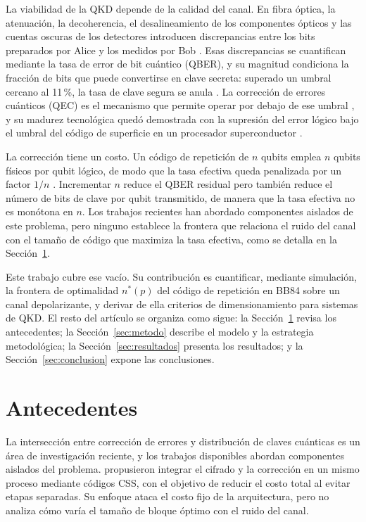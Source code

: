 \documentclass[conference]{IEEEtran}
\begin{document}
La viabilidad de la QKD depende de la calidad del canal. En fibra óptica, la
atenuación, la decoherencia, el desalineamiento de los componentes ópticos y las
cuentas oscuras de los detectores introducen discrepancias entre los bits
preparados por Alice y los medidos por Bob \cite{xu2020}. Esas discrepancias se
cuantifican mediante la tasa de error de bit cuántico (QBER), y su magnitud
condiciona la fracción de bits que puede convertirse en clave secreta: superado
un umbral cercano al 11\,\%, la tasa de clave segura se anula \cite{shor2000}.
La corrección de errores cuánticos (QEC) es el mecanismo que permite operar por
debajo de ese umbral \cite{nielsen2010,terhal2015}, y su madurez tecnológica
quedó demostrada con la supresión del error lógico bajo el umbral del código de
superficie en un procesador superconductor \cite{acharya2025}.

La corrección tiene un costo. Un código de repetición de $n$ qubits emplea $n$
qubits físicos por qubit lógico, de modo que la tasa efectiva queda penalizada
por un factor $1/n$ \cite{fowler2012}. Incrementar $n$ reduce el QBER residual
pero también reduce el número de bits de clave por qubit transmitido, de manera
que la tasa efectiva no es monótona en $n$. Los trabajos recientes han abordado
componentes aislados de este problema, pero ninguno establece la frontera que
relaciona el ruido del canal con el tamaño de código que maximiza la tasa
efectiva, como se detalla en la Sección~\ref{sec:antecedentes}.

Este trabajo cubre ese vacío. Su contribución es cuantificar, mediante
simulación, la frontera de optimalidad $n^{*}(p)$ del código de repetición en
BB84 sobre un canal depolarizante, y derivar de ella criterios de
dimensionamiento para sistemas de QKD. El resto del artículo se organiza como
sigue: la Sección~\ref{sec:antecedentes} revisa los antecedentes; la
Sección~\ref{sec:metodo} describe el modelo y la estrategia metodológica; la
Sección~\ref{sec:resultados} presenta los resultados; y la
Sección~\ref{sec:conclusion} expone las conclusiones.

\section{Antecedentes}
\label{sec:antecedentes}

La intersección entre corrección de errores y distribución de claves cuánticas
es un área de investigación reciente, y los trabajos disponibles abordan
componentes aislados del problema. \cite{jha2024} propusieron integrar el cifrado
y la corrección en un mismo proceso mediante códigos CSS, con el objetivo de
reducir el costo total al evitar etapas separadas. Su enfoque ataca el costo
fijo de la arquitectura, pero no analiza cómo varía el tamaño de bloque óptimo
con el ruido del canal.
\end{document}
